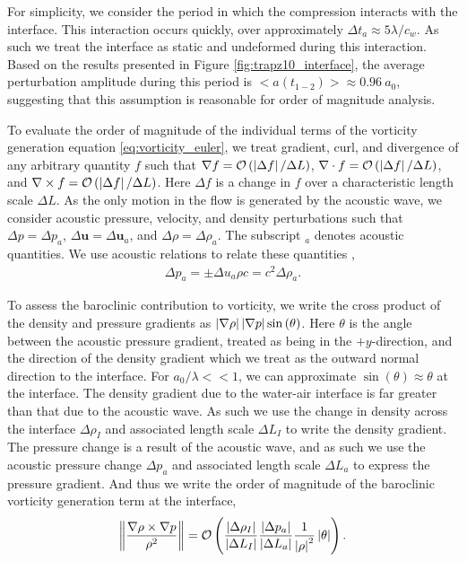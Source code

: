 For simplicity, we consider the period in which the compression
interacts with the interface. This interaction occurs
quickly, over approximately $\Delta t_a\approx5\lambda/c_{w}$. As such
we treat the interface as static and undeformed during this
interaction. Based on the results presented in Figure
\ref{fig:trapz10_interface}, the average perturbation amplitude during
this period is $<a(t_{1-2})>\approx0.96\ a_0$, suggesting that this
assumption is reasonable for order of magnitude analysis.

To evaluate the order of magnitude of the individual terms of the
vorticity generation equation \eqref{eq:vorticity_euler}, we treat
gradient, curl, and divergence of any arbitrary quantity $f$ such that
$\nabla f= \mathcal{O}\left(\left|\Delta f\right|/\Delta L\right)$,
$\nabla\cdot f=\mathcal{O}\left(\left|\Delta f\right|/\Delta L\right)$, and
$\nabla\times f=\mathcal{O}\left(\left|\Delta f\right|/\Delta L\right)$. Here
$\Delta f$ is a change in $f$ over a characteristic length scale
$\Delta L$. As the only motion in the flow is generated by the
acoustic wave, we consider acoustic pressure, velocity, and density
perturbations such that $\Delta p=\Delta p_a$,
$\Delta \boldsymbol{u}=\Delta \boldsymbol{u}_a$, and
$\Delta \rho=\Delta \rho_a$. The subscript $_a$ denotes acoustic
quantities. We use acoustic relations to relate these quantities
\citep{Anderson1990},
\begin{align}%
  \label{eq:acoustic_relations}%
  \Delta p_a=\pm\Delta u_a \rho c=c^2\Delta \rho_a.%
\end{align}

To assess the baroclinic contribution to vorticity, we write the cross
product of the density and pressure gradients as
$\left|\nabla \rho\right| \left|\nabla p\right| \sin{\left(\theta\right)}$. Here
$\theta$ is the angle between the acoustic pressure gradient, treated
as being in the $\plus y$-direction, and the direction of the density
gradient which we treat as the outward normal direction to the
interface. For $a_0/\lambda<<1$, we can approximate
$\sin{\left(\theta\right)}\approx\theta$ at the interface. The density
gradient due to the water-air interface is far greater than that due
to the acoustic wave. As such we use the change in density across the
interface $\Delta \rho_I$ and associated length scale $\Delta L_I$ to
write the density gradient. The pressure change is a result of the
acoustic wave, and as such we use the acoustic pressure change
$\Delta p_a$ and associated length scale $\Delta L_a$ to express the
pressure gradient. And thus we write the order of magnitude of the
baroclinic vorticity generation term at the interface,
\begin{align}
  \label{eq:baroclinic_vorticity}%
  \norm{\frac{\nabla\rho\times\nabla p}{\rho^2}} =%
  \orderof{\frac{\abs{\Delta \rho_I}}{\abs{\Delta L_I}}\frac{\abs{\Delta p_a}}{\abs{\Delta L_a}}\frac{1}{\abs{\rho}^2}\abs{\theta}}.%
\end{align}

